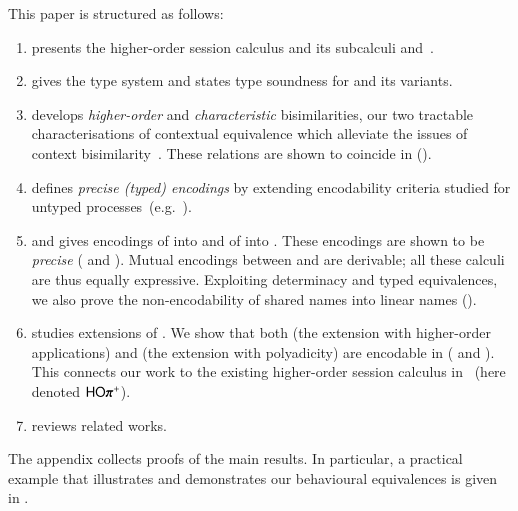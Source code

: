\smallskip

 This paper 
is structured as follows:
%
\begin{enumerate}[$\bullet$]

	\item	{} presents the higher-order session calculus \HOp and its 
		subcalculi \HO and~\sessp. 

	\item	{} gives the type system
		and states type soundness for \HOp and its variants.

	\item	{} 
		develops \emph{higher-order} and \emph{characteristic} bisimilarities, our two
		tractable characterisations of contextual equivalence which 
		alleviate the issues of context bisimilarity~\cite{San96H}. These 
		relations are shown to coincide in \HOp ().

	\item	{} defines \emph{precise (typed) encodings} by extending encodability criteria 
		studied for
		untyped processes~(e.g.~\cite{DBLP:journals/iandc/Gorla10,DBLP:conf/icalp/LanesePSS10}).

	\item	{} and 
		gives encodings of \HOp into \HO and of \HOp into \sessp.
		These encodings 
		are shown to be \emph{precise} ( and ).
		Mutual encodings between \sessp and \HO are derivable; 
		all these calculi are thus equally expressive.
		Exploiting determinacy and typed equivalences,
		we also prove the non-encodability of shared names
		into linear names ().

	\item	{} studies extensions of \HOp. We show that 
		both \HOpp (the extension with higher-order applications) 
		and \pHOp (the extension with polyadicity) are encodable in \HOp
		( and ).
		This connects our work 
		to the existing
		higher-order session calculus in~\cite{tlca07} (here denoted  $\pHOpp$).

	\item	{} reviews related works.
\end{enumerate}
The appendix collects proofs of the main results.
In particular, a practical example that illustrates \HOp and demonstrates our behavioural equivalences is given in
.


